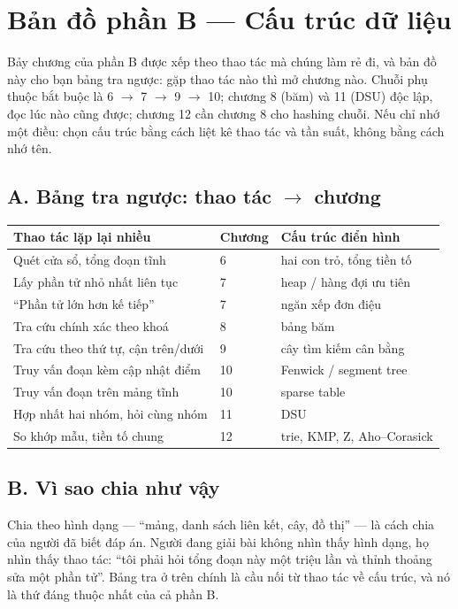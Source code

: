 \documentclass[../algorithm.tex]{subfiles}
\begin{document}
\section*{Bản đồ phần B --- Cấu trúc dữ liệu}

\begin{tomtat}
Bảy chương của phần B được xếp theo thao tác mà chúng làm rẻ đi, và bản đồ này cho bạn bảng tra ngược: gặp thao tác nào thì mở chương nào. Chuỗi phụ thuộc bắt buộc là 6 \(\rightarrow\) 7 \(\rightarrow\) 9 \(\rightarrow\) 10; chương 8 (băm) và 11 (DSU) độc lập, đọc lúc nào cũng được; chương 12 cần chương 8 cho hashing chuỗi. Nếu chỉ nhớ một điều: chọn cấu trúc bằng cách liệt kê thao tác và tần suất, không bằng cách nhớ tên.
\end{tomtat}

\subsection*{A. Bảng tra ngược: thao tác \(\rightarrow\) chương}
\begin{center}\footnotesize
\begin{tabularx}{\linewidth}{@{}L{5.2cm}L{3.0cm}Y@{}}
\toprule
\textbf{Thao tác lặp lại nhiều} & \textbf{Chương} & \textbf{Cấu trúc điển hình}\\
\midrule
Quét cửa sổ, tổng đoạn tĩnh & 6 & hai con trỏ, tổng tiền tố\\
Lấy phần tử nhỏ nhất liên tục & 7 & heap / hàng đợi ưu tiên\\
``Phần tử lớn hơn kế tiếp'' & 7 & ngăn xếp đơn điệu\\
Tra cứu chính xác theo khoá & 8 & bảng băm\\
Tra cứu theo thứ tự, cận trên/dưới & 9 & cây tìm kiếm cân bằng\\
Truy vấn đoạn kèm cập nhật điểm & 10 & Fenwick / segment tree\\
Truy vấn đoạn trên mảng tĩnh & 10 & sparse table\\
Hợp nhất hai nhóm, hỏi cùng nhóm & 11 & DSU\\
So khớp mẫu, tiền tố chung & 12 & trie, KMP, Z, Aho--Corasick\\
\bottomrule
\end{tabularx}
\end{center}

\subsection*{B. Vì sao chia như vậy}
Chia theo hình dạng --- ``mảng, danh sách liên kết, cây, đồ thị'' --- là cách chia của người đã biết đáp án. Người đang giải bài không nhìn thấy hình dạng, họ nhìn thấy thao tác: ``tôi phải hỏi tổng đoạn này một triệu lần và thỉnh thoảng sửa một phần tử''. Bảng tra ở trên chính là cầu nối từ thao tác về cấu trúc, và nó là thứ đáng thuộc nhất của cả phần B.
\end{document}
